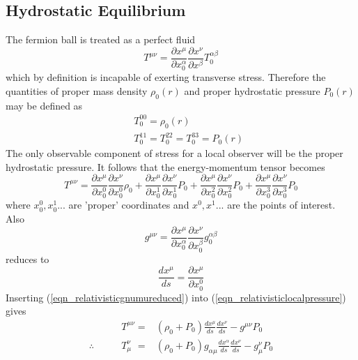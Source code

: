 \subsection{Hydrostatic Equilibrium}
The fermion ball is treated as a perfect fluid \cite{ref_tolmanbook}
\begin{equation}
	T^{\mu \nu} = \frac{\partial x^\mu}{\partial x_0^\alpha} \frac{\partial x^\nu}{\partial x^\beta} T_0^{\alpha \beta}
	\label{eqn_relativisticfluid}
\end{equation}
which by definition is incapable of exerting transverse stress. Therefore the quantities of proper mass density $\rho_0(r)$
and proper hydrostatic pressure $P_0(r)$ may be defined as
\begin{eqnarray}
	&& T_0^{00} = \rho_0(r)
	\label{eqn_relativisticpropermassdensity} \\
	&& T_0^{11} = T_0^{22} = T_0^{33} = P_0(r)
	\label{eqn_relativisticproperpressure}
\end{eqnarray}
The only observable component of stress for a local observer will be the proper hydrostatic pressure. It follows that the
energy-momentum tensor becomes
\begin{equation}
	T^{\mu \nu} = \frac{\partial x^\mu}{\partial x_0^0}\frac{\partial x^\nu}{\partial x_0^0} \rho_0
		    + \frac{\partial x^\mu}{\partial x_0^1}\frac{\partial x^\nu}{\partial x_0^1} P_0
		    + \frac{\partial x^\mu}{\partial x_0^2}\frac{\partial x^\nu}{\partial x_0^2} P_0
		    + \frac{\partial x^\mu}{\partial x_0^3}\frac{\partial x^\nu}{\partial x_0^3} P_0
	\label{eqn_relativisticlocalpressure}
\end{equation}
where $x_0^0, x_0^1...$ are 'proper' coordinates and $x^0, x^1...$ are the points of interest. Also
\begin{equation}
	g^{\mu \nu} = \frac{\partial x^\mu}{\partial x_0^\alpha}\frac{\partial x^\nu}{\partial x_0^\beta} g_0^{\alpha \beta}
	\label{eqn_relativisticgnumu}
\end{equation}
reduces to
\begin{equation}
	\frac{d x^\mu}{ds} = \frac{\partial x^\mu}{\partial x_0^0}
	\label{eqn_relativisticgnumureduced}
\end{equation}
Inserting (\ref{eqn_relativisticgnumureduced}) into (\ref{eqn_relativisticlocalpressure}) gives
\begin{eqnarray}
	&T^{\mu \nu} =& (\rho_0 + P_0) \frac{dx^\mu}{ds} \frac{dx^\nu}{ds} - g^{\mu \nu} P_0 \nonumber \\
	\therefore \qquad &T_\mu^{\nu \phantom{\mu}} =& (\rho_0 + P_0) g_{\alpha \mu} \frac{dx^\alpha}{ds} \frac{dx^\nu}{ds} - g_\mu^\nu P_0
	\label{eqn_relativisticenergysoln}
\end{eqnarray}
